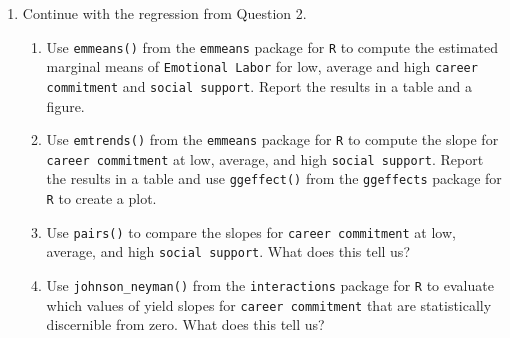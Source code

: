 \documentclass{article}\usepackage[]{graphicx}\usepackage[]{xcolor}
\begin{document}
\begin{enumerate}
  \begin{enumerate}
    \item Perform a residual analysis. Do you have any concerns about the model
    fit?
    \item Perform an analysis of leverage/influence. Do you have any concerns 
    about the model fit?
    \item Provide the results of the overall $F$ test. What does this tell you
    about the model you fit?
    \item Based on the model fit, does the amount of social support impact the 
    effect of career commitment on emotional labor?
  \end{enumerate}
  \item Continue with the regression from Question 2.
  \begin{enumerate}
    \item Use \texttt{emmeans()} from the \texttt{emmeans} package
    for \texttt{R} \citep{emmeans} to compute the estimated marginal means of
    \texttt{Emotional Labor} for low, average and high \texttt{career commitment}
    and \texttt{social support}. Report the results in a table and a figure.
    \item Use \texttt{emtrends()} from the \texttt{emmeans} package
    for \texttt{R} \citep{emmeans} to compute the slope for \texttt{career commitment}
    at low, average, and high \texttt{social support}. Report the results in a 
    table and use \texttt{ggeffect()} from the \texttt{ggeffects} package for
    \texttt{R} \citep{ggeffects} to create a plot. 
    \item Use \texttt{pairs()} to compare the slopes for \texttt{career commitment}
    at low, average, and high \texttt{social support}. What does this tell us?
    \item Use \texttt{johnson\_neyman()} from the \texttt{interactions} package
    for \texttt{R} \citep{interactions} to evaluate which values of 
     yield slopes for  \texttt{career commitment} that
    are statistically discernible from zero. What does this tell us?
  \end{enumerate}
\end{enumerate}

\end{document}
